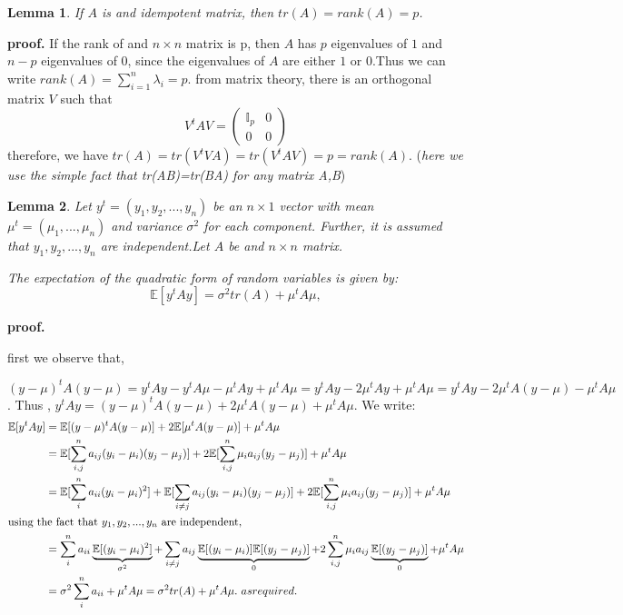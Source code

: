 \documentclass[12pt]{report}
\newtheorem {lemme}{Lemma} %
\begin{document}
	\begin{lemme}
		If $A$ is and idempotent matrix, then $tr(A)=rank(A)=p$.
	\end{lemme}
	\textbf{proof.}
	{\selectfont
		If the rank of and $n \times n$ matrix is p, then $A$ has $p$ eigenvalues of $1$ and $n-p$ eigenvalues of $0$, since the eigenvalues of $A$ are either $1$ or $0$.Thus we can write $rank(A)=\sum_{i=1}^{n}\lambda_{i}=p$.
		from matrix theory, there is an orthogonal matrix $V$ such that
		$$
		V^{t}AV = 
		\begin{pmatrix}
			\mathbb{I}_{p} & 0\\
			0       & 0 
		\end{pmatrix} 
		$$ therefore, we have $tr(A)=tr(V^{t}VA)=tr(V^{t}AV)=p=rank(A)$. (\textit{here we use the simple fact that tr(AB)=tr(BA) for any matrix A,B})
	}
	\begin{lemme}
		Let $y^{t}=(y_{1},y_{2},...,y_{n})$ be an $n\times 1$ vector with mean $\mu^{t}=(\mu_{1},...,\mu_{n})$ and variance $\sigma^{2}$  for each component. Further, it is assumed that $y_{1},y_{2},...,y_{n}$ are independent.Let $A$ be and $n\times n$ matrix.
		
		The expectation of the quadratic form of random variables is given by:
		\begin{equation}
			\mathbb{E}[y^{t}Ay]=\sigma^{2}tr(A)+\mu^{t}A\mu ,
			\label{f5}
		\end{equation}
	\end{lemme}
	\textbf{proof.}
	{\selectfont
		first we observe that,
		
		$(y-\mu)^{t}A(y-\mu)=y^{t}Ay-y^{t}A\mu-\mu^{t}Ay+\mu^{t}A\mu=y^{t}Ay-2\mu^{t}Ay+\mu^{t}A\mu=y^{t}Ay-2\mu^{t}A(y-\mu)-\mu^{t}A\mu$. Thus , $y^{t}Ay=(y-\mu)^{t}A(y-\mu)+2\mu^{t}A(y-\mu)+\mu^{t}A\mu$. We write:
		\begin{align*}
			\mathbb{E}[y^{t}Ay]&=\mathbb{E}[(y-\mu)^{t}A(y-\mu)] + 2\mathbb{E}[\mu^{t}A(y-\mu)] +\mu^{t}A\mu\\
			&=\mathbb{E}[\sum_{i,j}^{n}a_{ij}(y_{i}-\mu_{i})(y_{j}-\mu_{j})]+2\mathbb{E}[\sum_{i,j}^{n}\mu_{i}a_{ij}(y_{j}-\mu_{j})] + \mu^{t}A\mu\\
			&=\mathbb{E}[\sum_{i}^{n}a_{ii}(y_{i}-\mu_{i})^{2}]+\mathbb{E}[\sum_{i\neq j}a_{ij}(y_{i}-\mu_{i})(y_{j}-\mu_{j})]+2\mathbb{E}[\sum_{i,j}^{n}\mu_{i}a_{ij}(y_{j}-\mu_{j})] + \mu^{t}A\mu\\
			\intertext{using the fact that $y_{1},y_{2},...,y_{n}$ are independent, }
			&=\sum_{i}^{n}a_{ii}\underbrace{\mathbb{E}[(y_{i}-\mu_{i})^{2}]}_{\sigma^{2}}+\sum_{i\neq j}a_{ij}\underbrace{\mathbb{E}[(y_{i}-\mu_{i})]\mathbb{E}[(y_{j}-\mu_{j})]}_{0} + 2\sum_{i,j}^{n}\mu_{i}a_{ij}\underbrace{\mathbb{E}[(y_{j}-\mu_{j})]}_{0}+\mu^{t}A\mu \\
			&=\sigma^{2}\sum_{i}^{n}a_{ii} + \mu^{t}A\mu=\sigma^{2}tr(A) + \mu^{t}A\mu. \ as required.
		\end{align*}
	}
\end{document}
